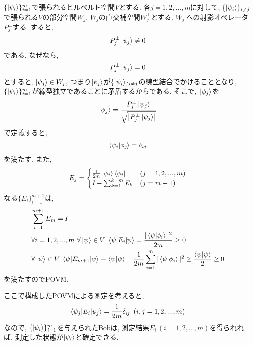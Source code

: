 \begin{ex}
    \label{ex2.64}
    $\{ \ket{\psi_i}\}_{i=1}^m$で張られるヒルベルト空間$V$とする. 各$j = 1, 2, \dots , m$に対して, $\{ \ket{\psi_i} \}_{i\neq j}$で張られる$V$の部分空間$W_j$, $W_j$の直交補空間$W_j^\perp$とする. $W_j^\perp$への射影オペレータ$P_j^\perp$する. すると, 
    \begin{align*}
        P_j^\perp \ket{\psi_j} \neq 0
    \end{align*}
    である. なぜなら, 
    \begin{align*}
        P_j^\perp \ket{\psi_j} = 0
    \end{align*}
    とすると, $\ket{\psi_j} \in W_j$, つまり$\ket{\psi_j}$が$\{ \ket{\psi_i} \}_{i\neq j}$の線型結合でかけることとなり, $\{ \ket{\psi_i}\}_{i=1}^m$が線型独立であることに矛盾するからである.
    そこで,\ $\ket{\phi_j}$を
    \begin{align*}
        \ket{\phi_j} = \frac{P_j^\perp \ket{\psi_j}}{ \sqrt{\left| P_j^\perp \ket{\psi_j} \right|}}
    \end{align*}
    で定義すると, 
    \begin{align*}
            \braket{\psi_i|\phi_j} = \delta_{ij}
    \end{align*}
    を満たす. また, 
    \begin{align*}
        E_j
        =
        \begin{cases}
            \frac{1}{2m} \ket{\phi_i} \bra{\phi_i} & (j=1,2, ...,m) \\
            I - \sum_{k=1}^{k=m} E_k    & (j=m+1)
        \end{cases}
    \end{align*}
    なる$\{ E_i\}_{i=1}^{m+1}$は,
    \begin{align*}
        &\sum_{i=1}^{m+1} E_m = I \\
        &\forall i = 1, 2, ..., m 
        \ \forall \ket{\psi} \in V
        \ \braket{\psi | E_i | \psi} = \frac{|\braket{\psi|\phi_i}|^2}{2m} \ge 0 \\
        &\forall \ket{\psi} \in V 
        \ \braket{\psi | E_{m+1} | \psi} 
        = \braket{\psi|\psi} - \frac{1}{2m}\sum_{i=1}^{m} |\braket{\psi|\phi_i}|^2
        \ge
        \frac{\braket{\psi|\psi}}{2} \ge 0
    \end{align*}
    を満たすのでPOVM.
    \par
    ここで構成したPOVMによる測定を考えると,
    \begin{align*}
        \braket{\psi_j | E_i | \psi_j} = \frac{1}{2m} \delta_{ij} 
        \ \left( i, j = 1, 2, ... ,m \right)
    \end{align*}
    なので, $\{ \ket{\psi_i}\}_{i=1}^m$を与えられたBobは, 測定結果$E_i \ (i = 1,2, ..., m)$を得られれば, 測定した状態が$\ket{\psi_i}$と確定できる.
\end{ex}


